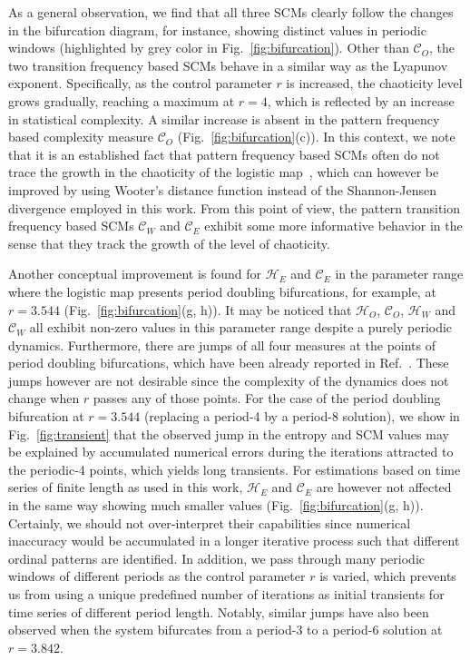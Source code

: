 \documentclass[aip,cha,reprint,nofootinbib]{revtex4-1}
\begin{document}
As a general observation, we find that all three SCMs clearly follow the changes in the bifurcation diagram, for instance, showing distinct values in periodic windows (highlighted by grey color in Fig.~\ref{fig:bifurcation}). Other than $\mathcal{C}_O$, the two transition frequency based SCMs behave in a similar way as the Lyapunov exponent. Specifically, as the control parameter $r$ is increased, the chaoticity level grows gradually, reaching a maximum at $r = 4$, which is reflected by an increase in statistical complexity. A similar increase is absent in the pattern frequency based complexity measure $\mathcal{C}_O$ (Fig.~\ref{fig:bifurcation}(c)). In this context, we note that it is an established fact that pattern frequency based SCMs often do not trace the growth in the chaoticity of the logistic map~\cite{MartinPLA2003}, which can however be improved by using Wooter's distance function instead of the Shannon-Jensen divergence employed in this work. From this point of view, the pattern transition frequency based SCMs $\mathcal{C}_W$ and $\mathcal{C}_E$ exhibit some more informative behavior in the sense that they track the growth of the level of chaoticity. 

Another conceptual improvement is found for $\mathcal{H}_E$ and $\mathcal{C}_E$ in the parameter range where the logistic map presents period doubling bifurcations, for example, at $r = 3.544$ (Fig.~\ref{fig:bifurcation}(g, h)). It may be noticed that $\mathcal{H}_O$, $\mathcal{C}_O$, $\mathcal{H}_W$ and $\mathcal{C}_W$ all exhibit non-zero values in this parameter range despite a purely periodic dynamics. Furthermore, there are jumps of all four measures at the points of period doubling bifurcations, which have been already reported in Ref.~\cite{BandtPRL2002}. These jumps however are not desirable since the complexity of the dynamics does not change when $r$ passes any of those points. For the case of the period doubling bifurcation at $r=3.544$ (replacing a period-4 by a period-8 solution), we show in Fig.~\ref{fig:transient} that the observed jump in the entropy and SCM values may be explained by accumulated numerical errors during the iterations attracted to the periodic-4 points, which yields long transients. For estimations based on time series of finite length as used in this work, $\mathcal{H}_E$ and $\mathcal{C}_E$ are however not affected in the same way showing much smaller values (Fig.~\ref{fig:bifurcation}(g, h)). Certainly, we should not over-interpret their capabilities since numerical inaccuracy would be accumulated in a longer iterative process such that different ordinal patterns are identified. In addition, we pass through many periodic windows of different periods as the control parameter $r$ is varied, which prevents us from using a unique predefined number of iterations as initial transients for time series of different period length. Notably, similar jumps have also been observed when the system bifurcates from a period-3 to a period-6 solution at $r = 3.842$. 
\end{document}
